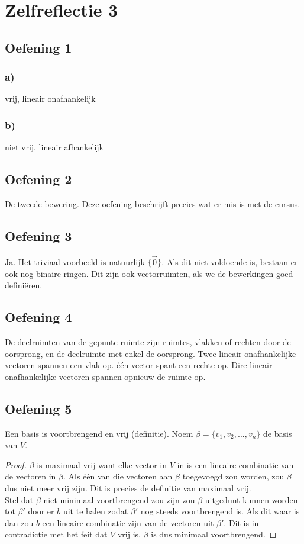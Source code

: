 \documentclass[lineaire_algebra_oplossingen.tex]{subfiles}
\begin{document}
\section{Zelfreflectie 3}
\subsection{Oefening 1}
\subsubsection*{a)}
vrij, lineair onafhankelijk
\subsubsection*{b)}
niet vrij, lineair afhankelijk

\subsection{Oefening 2}
De tweede bewering. Deze oefening beschrijft precies wat er mis is met de cursus.

\subsection{Oefening 3}
Ja. Het triviaal voorbeeld is natuurlijk $\{\vec{0}\}$. Als dit niet voldoende is, bestaan er ook nog binaire ringen. Dit zijn ook vectorruimten, als we de bewerkingen goed defini\"eren.

\subsection{Oefening 4}
De deelruimten van de gepunte ruimte zijn ruimtes, vlakken of rechten door de oorsprong, en de deelruimte met enkel de oorsprong. Twee lineair onafhankelijke vectoren spannen een vlak op. één vector spant een rechte op. Dire lineair onafhankelijke vectoren spannen opnieuw de ruimte op. 

\subsection{Oefening 5}
Een basis is voortbrengend en vrij (definitie). Noem $\beta = \{v_1,v_2,...,v_n\}$ de basis van $V$.
\begin{proof}
$\beta$ is maximaal vrij want elke vector in $V$ in is een lineaire combinatie van de vectoren in $\beta$. Als één van die vectoren aan $\beta$ toegevoegd zou worden, zou $\beta$ dus niet meer vrij zijn. Dit is precies de definitie van maximaal vrij.\\
Stel dat $\beta$ niet minimaal voortbrengend zou zijn zou $\beta$ uitgedunt kunnen worden tot $\beta'$ door er $b$ uit te halen zodat $\beta'$ nog steeds voortbrengend is. Als dit waar is dan zou $b$ een lineaire combinatie zijn van de vectoren uit $\beta'$. Dit is in contradictie met het feit dat $V$ vrij is. $\beta$ is dus minimaal voortbrengend.
\end{proof}
\end{document}
